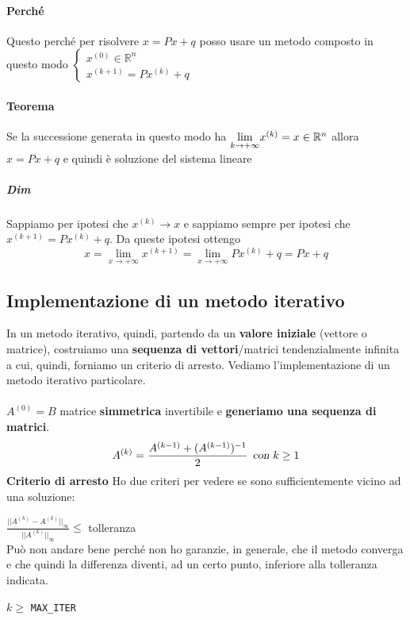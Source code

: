 \documentclass[10pt]{book}
\begin{document}
\paragraph{Perché} Questo perché per risolvere $x = Px + q$ posso usare un metodo composto in questo modo $\left\{ \begin{array}{l}
x^{(0)} \in \mathbb{R}^n\\
x^{(k + 1)} = Px^{(k)} + q
\end{array} \right.$
\paragraph{Teorema} Se la successione generata in questo modo ha $\mathlarger{\lim_{k\to +\infty}} x^{(k)} = x \in \mathbb{R}^n$ allora $x = Px + q$ e quindi è soluzione del sistema lineare
\subparagraph{Dim} Sappiamo per ipotesi che $x^{(k)} \rightarrow x$ e sappiamo sempre per ipotesi che $x^{(k + 1)} = Px^{(k)} + q$. Da queste ipotesi ottengo
$$x = \lim_{x\to +\infty}x^{(k + 1)} = \lim_{x\to +\infty} Px^{(k)} + q = Px + q$$
\subsection{Implementazione di un metodo iterativo}
In un metodo iterativo, quindi, partendo da un \textbf{valore iniziale} (vettore o matrice), costruiamo una \textbf{sequenza di vettori}/matrici tendenzialmente infinita a cui, quindi, forniamo un criterio di arresto. Vediamo l'implementazione di un metodo iterativo particolare.\\\\
$A^{(0)} = B$ matrice \textbf{simmetrica} invertibile e \textbf{generiamo una sequenza di matrici}.\\
$$A^{(k)} = \frac{A^{(k-1)} + (A^{(k-1)})^{-1}}{2}\:\:\textsl{con }k \geq 1$$
\textbf{Criterio di arresto} Ho due criteri per vedere se sono sufficientemente vicino ad una soluzione:
\begin{list}{}{}
	\item $\frac{||A^{(k)} - A^{(k)}||_{\infty}}{||A^{(k)}||_{\infty}} \leq$ tolleranza\\
	Può non andare bene perché non ho garanzie, in generale, che il metodo converga e che quindi la differenza diventi, ad un certo punto, inferiore alla tolleranza indicata.
	\item $k \geq$ \texttt{MAX\_ITER}
\end{list}
\pagebreak
\end{document}
